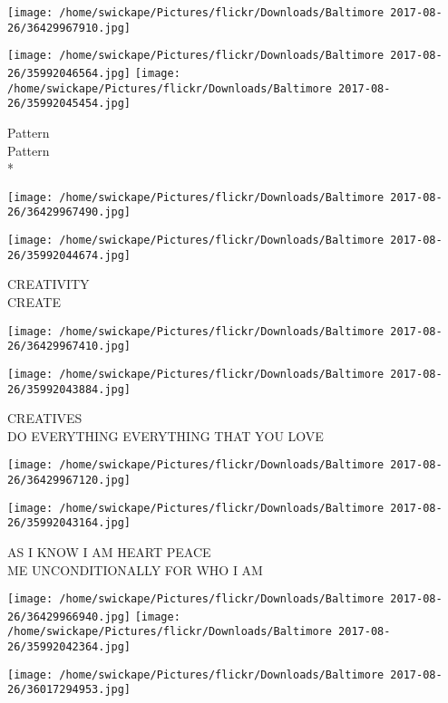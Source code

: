 \documentclass[10pt,letterpaper]{article}
\begin{document}
\texttt{[image: /home/swickape/Pictures/flickr/Downloads/Baltimore 2017-08-26/36429967910.jpg]}

\vspace{0.25in}
\texttt{[image: /home/swickape/Pictures/flickr/Downloads/Baltimore 2017-08-26/35992046564.jpg]}
\texttt{[image: /home/swickape/Pictures/flickr/Downloads/Baltimore 2017-08-26/35992045454.jpg]}

Pattern\\
Pattern\\
*\\
\pagebreak

\texttt{[image: /home/swickape/Pictures/flickr/Downloads/Baltimore 2017-08-26/36429967490.jpg]}

\vspace{0.25in}
\texttt{[image: /home/swickape/Pictures/flickr/Downloads/Baltimore 2017-08-26/35992044674.jpg]}

CREATIVITY\\
CREATE\\
\pagebreak

\texttt{[image: /home/swickape/Pictures/flickr/Downloads/Baltimore 2017-08-26/36429967410.jpg]}

\vspace{0.25in}
\texttt{[image: /home/swickape/Pictures/flickr/Downloads/Baltimore 2017-08-26/35992043884.jpg]}

CREATIVES\\
DO EVERYTHING EVERYTHING THAT YOU LOVE\\
\pagebreak

\texttt{[image: /home/swickape/Pictures/flickr/Downloads/Baltimore 2017-08-26/36429967120.jpg]}

\vspace{0.25in}
\texttt{[image: /home/swickape/Pictures/flickr/Downloads/Baltimore 2017-08-26/35992043164.jpg]}

AS I KNOW I AM HEART PEACE\\
ME UNCONDITIONALLY FOR WHO I AM\\
\pagebreak

\texttt{[image: /home/swickape/Pictures/flickr/Downloads/Baltimore 2017-08-26/36429966940.jpg]}
\texttt{[image: /home/swickape/Pictures/flickr/Downloads/Baltimore 2017-08-26/35992042364.jpg]}

\texttt{[image: /home/swickape/Pictures/flickr/Downloads/Baltimore 2017-08-26/36017294953.jpg]}
\end{document}
